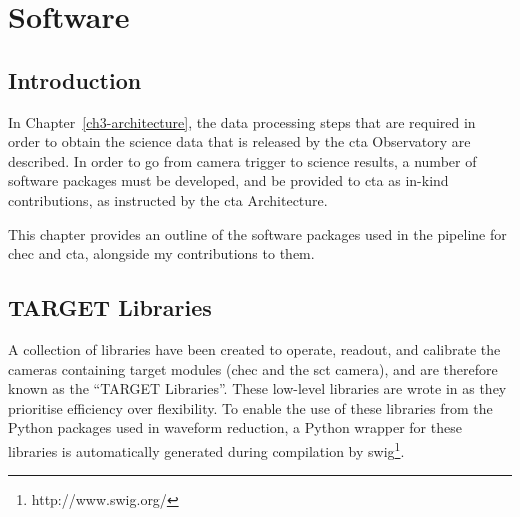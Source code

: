 \chapter{\label{ch4-software}Software} 

\minitoc


\section{Introduction}

In Chapter~\ref{ch3-architecture}, the data processing steps that are required in order to obtain the science data that is released by the \gls{cta} Observatory are described. In order to go from camera trigger to science results, a number of software packages must be developed, and be provided to \gls{cta} as in-kind contributions, as instructed by the \gls{cta} Architecture. 

This chapter provides an outline of the software packages used in the pipeline for \gls{chec} and \gls{cta}, alongside my contributions to them.

\section{TARGET Libraries}

A collection of libraries have been created to operate, readout, and calibrate the cameras containing \gls{target} modules (\gls{chec} and the \gls{sct} camera), and are therefore known as the ``TARGET Libraries''. These low-level libraries are wrote in \cpp as they prioritise efficiency over flexibility. To enable the use of these libraries from the Python packages used in waveform reduction, a Python wrapper for these libraries is automatically generated during compilation by \gls{swig}\footnote{http://www.swig.org/}.

